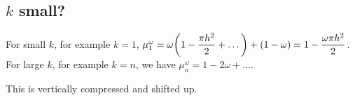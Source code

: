 \documentclass{article}
\begin{document}
        \subsection{$k$ small?}
            For small $k$, for example $k = 1$, $\mu_1^\omega = \omega\qty(1 - \dfrac{\pi h^2}{2} + \dots) + \qty(1 - \omega) = 1 - \dfrac{\omega\pi h^2}{2}$.
            For large $k$, for example $k = n$, we have $\mu_n^\omega = 1 - 2\omega + \dots$.
            \begin{figure}[ht!]
                \centering
            \end{figure}
            \FloatBarrier
            This is vertically compressed and shifted up.
\end{document}
